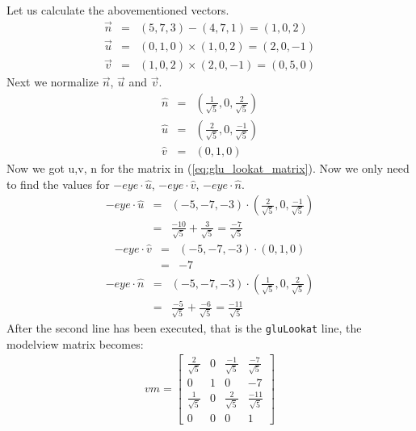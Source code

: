 \begin{itemize}
{        Let us calculate the abovementioned vectors.
        \begin{eqnarray}
            \vec{n} &=& (5,7,3) - (4,7,1) = (1,0,2)\\
            \vec{u} &=& (0,1,0) \times (1,0,2) = (2,0,-1)\\
            \vec{v} &=& (1,0,2) \times (2,0,-1) = (0,5,0)
        \end{eqnarray}
        Next we normalize $\vec{n}$, $\vec{u}$ and $\vec{v}$.
        \begin{eqnarray}
            \hat{n} &=& \left( \frac{1}{\sqrt{5}}, 0,  \frac{2}{\sqrt{5}} \right)\\
            \hat{u} &=& \left( \frac{2}{\sqrt{5}}, 0, \frac{-1}{\sqrt{5}} \right)\\
            \hat{v} &=& \left( 0,1,0 \right)
        \end{eqnarray}
        Now we got u,v, n for the matrix in (\ref{eq:glu_lookat_matrix}). Now we only need to
        find the values for $-eye \cdot \hat{u}$, $-eye \cdot \hat{v}$, $-eye \cdot \hat{n}$.
        \begin{eqnarray}
            -eye \cdot \hat{u} &=& (-5, -7, -3) \cdot \left( \frac{2}{\sqrt{5}}, 0, \frac{-1}{\sqrt{5}} \right)\\
            &=& \frac{-10}{\sqrt{5}} + \frac{3}{\sqrt{5}} = \frac{-7}{\sqrt{5}}
        \end{eqnarray}
        \begin{eqnarray}
            -eye \cdot \hat{v} &=& (-5, -7, -3) \cdot \left(0,1,0\right)\\
            &=& -7
        \end{eqnarray}
        \begin{eqnarray}
            -eye \cdot \hat{n} &=& (-5, -7, -3) \cdot \left( \frac{1}{\sqrt{5}}, 0, \frac{2}{\sqrt{5}} \right)\\
            &=& \frac{-5}{\sqrt{5}} + \frac{-6}{\sqrt{5}} = \frac{-11}{\sqrt{5}}
        \end{eqnarray}
        After the second line has been executed, that is the \texttt{gluLookat} line, the modelview matrix becomes:
        \begin{eqnarray}
            vm = \begin{bmatrix}
                \frac{2}{\sqrt{5}} & 0 & \frac{-1}{\sqrt{5}} & \frac{-7}{\sqrt{5}} \\
                0 & 1 & 0 & -7 \\
                \frac{1}{\sqrt{5}} & 0 & \frac{2}{\sqrt{5}} & \frac{-11}{\sqrt{5}} \\
                0 & 0 & 0 & 1
            \end{bmatrix}
        \end{eqnarray}
    }


\end{itemize}
